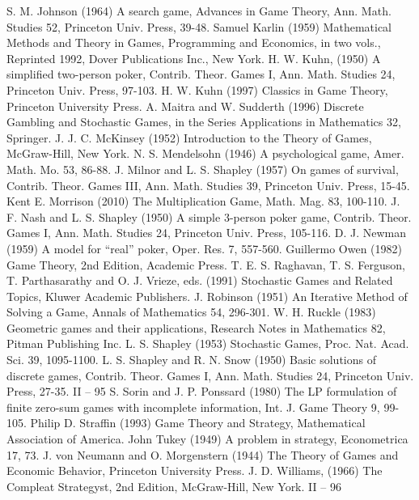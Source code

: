 S. M. Johnson (1964) A search game, Advances in Game Theory, Ann. Math. Studies 52,
Princeton Univ. Press, 39-48.
Samuel Karlin (1959) Mathematical Methods and Theory in Games, Programming and
Economics, in two vols., Reprinted 1992, Dover Publications Inc., New York.
H. W. Kuhn, (1950) A simplified two-person poker, Contrib. Theor. Games I, Ann. Math.
Studies 24, Princeton Univ. Press, 97-103.
H. W. Kuhn (1997) Classics in Game Theory, Princeton University Press.
A. Maitra and W. Sudderth (1996) Discrete Gambling and Stochastic Games, in the Series
Applications in Mathematics 32, Springer.
J. J. C. McKinsey (1952) Introduction to the Theory of Games, McGraw-Hill, New York.
N. S. Mendelsohn (1946) A psychological game, Amer. Math. Mo. 53, 86-88.
J. Milnor and L. S. Shapley (1957) On games of survival, Contrib. Theor. Games III, Ann.
Math. Studies 39, Princeton Univ. Press, 15-45.
Kent E. Morrison (2010) The Multiplication Game, Math. Mag. 83, 100-110.
J. F. Nash and L. S. Shapley (1950) A simple 3-person poker game, Contrib. Theor. Games
I, Ann. Math. Studies 24, Princeton Univ. Press, 105-116.
D. J. Newman (1959) A model for “real” poker, Oper. Res. 7, 557-560.
Guillermo Owen (1982) Game Theory, 2nd Edition, Academic Press.
T. E. S. Raghavan, T. S. Ferguson, T. Parthasarathy and O. J. Vrieze, eds. (1991) Stochastic
Games and Related Topics, Kluwer Academic Publishers.
J. Robinson (1951) An Iterative Method of Solving a Game, Annals of Mathematics 54,
296-301.
W. H. Ruckle (1983) Geometric games and their applications, Research Notes in Mathematics
82, Pitman Publishing Inc.
L. S. Shapley (1953) Stochastic Games, Proc. Nat. Acad. Sci. 39, 1095-1100.
L. S. Shapley and R. N. Snow (1950) Basic solutions of discrete games, Contrib. Theor.
Games I, Ann. Math. Studies 24, Princeton Univ. Press, 27-35.
II – 95
S. Sorin and J. P. Ponssard (1980) The LP formulation of finite zero-sum games with
incomplete information, Int. J. Game Theory 9, 99-105.
Philip D. Straffin (1993) Game Theory and Strategy, Mathematical Association of America.
John Tukey (1949) A problem in strategy, Econometrica 17, 73.
J. von Neumann and O. Morgenstern (1944) The Theory of Games and Economic Behavior,
Princeton University Press.
J. D. Williams, (1966) The Compleat Strategyst, 2nd Edition, McGraw-Hill, New York.
II – 96
